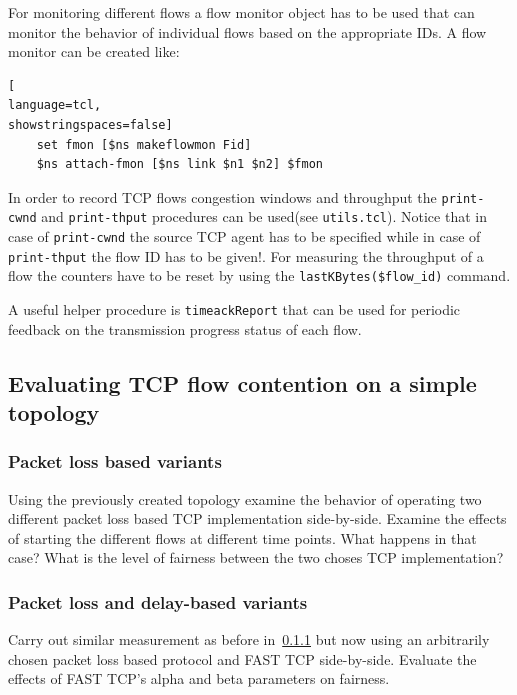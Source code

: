\documentclass[a4paper]{article}
\begin{document}
For monitoring different flows a flow monitor object has to be used that can monitor the behavior of individual flows
based on the appropriate IDs.
A flow monitor can be created like:

\begin{lstlisting}[
language=tcl,
showstringspaces=false]
    set fmon [$ns makeflowmon Fid]
    $ns attach-fmon [$ns link $n1 $n2] $fmon
\end{lstlisting}

In order to record TCP flows congestion windows and throughput the \verb!print-cwnd! and \verb!print-thput!
procedures can be used(see \verb!utils.tcl!).
Notice that in case of	\verb!print-cwnd! the source TCP agent has to be specified while in case of
\verb!print-thput! the flow ID has to be given!.
For measuring the throughput of a flow the counters have to be reset by using the \verb!lastKBytes($flow_id)! command.

A useful helper procedure is \verb!timeackReport! that can be used for periodic feedback on
the transmission progress status of each flow.

\subsection{Evaluating TCP flow contention on a simple topology}

\subsubsection{Packet loss based variants}\label{sec:plossexercise}

Using the previously created topology examine the behavior of operating two different packet loss based
TCP implementation side-by-side. Examine the effects of starting the different flows at different time points.
What happens in that case? What is the level of fairness between the two choses TCP implementation?

\subsubsection{Packet loss and delay-based variants}

Carry out similar measurement as before in~\ref{sec:plossexercise} but now using an arbitrarily chosen
packet loss based protocol and FAST TCP side-by-side. Evaluate the effects of FAST TCP's alpha and beta parameters on fairness.
\end{document}
